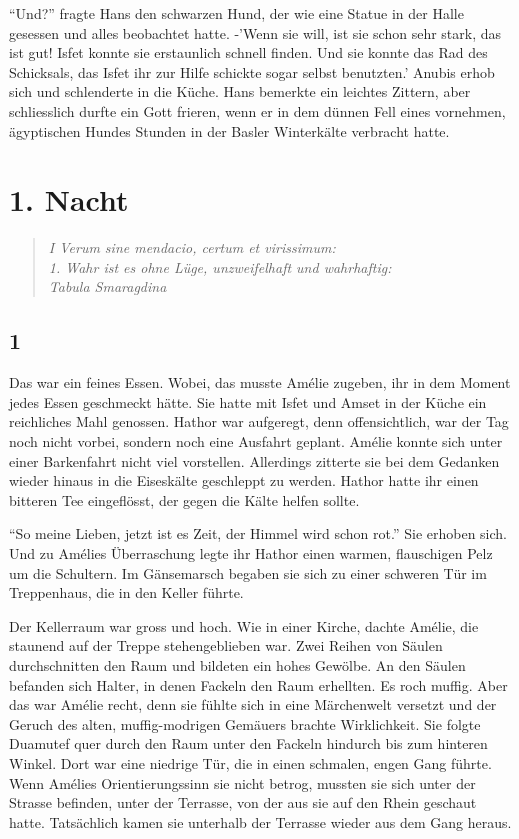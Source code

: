 \documentclass[11pt,titlepage,a5paper]{book}
\begin{document}
"`Und?"' fragte Hans den schwarzen Hund, der wie eine Statue in der Halle gesessen und alles beobachtet hatte. -'Wenn sie will, ist sie schon sehr stark, das ist gut! Isfet konnte sie erstaunlich schnell finden. Und sie konnte das Rad des Schicksals, das Isfet ihr zur Hilfe schickte sogar selbst benutzten.' Anubis erhob sich und schlenderte in die Küche. Hans bemerkte ein leichtes Zittern, aber schliesslich durfte ein Gott frieren, wenn er in dem dünnen Fell eines vornehmen, ägyptischen Hundes Stunden in der Basler Winterkälte verbracht hatte.

\chapter*{1. Nacht}

\begin{quotation}

\emph{I Verum sine mendacio, certum et virissimum:\\ 1. Wahr ist es ohne Lüge, unzweifelhaft und wahrhaftig:\\Tabula Smaragdina}

\end{quotation}

\section*{1}

Das war ein feines Essen. Wobei, das musste Amélie zugeben, ihr in dem Moment jedes Essen geschmeckt hätte. Sie hatte mit Isfet und Amset in der Küche ein reichliches Mahl genossen. Hathor war aufgeregt, denn offensichtlich, war der Tag noch nicht vorbei, sondern noch eine Ausfahrt geplant. Amélie konnte sich unter einer Barkenfahrt nicht viel vorstellen. Allerdings zitterte sie bei dem Gedanken wieder hinaus in die Eiseskälte geschleppt zu werden. Hathor hatte ihr einen bitteren Tee eingeflösst, der gegen die Kälte helfen sollte.

"`So meine Lieben, jetzt ist es Zeit, der Himmel wird schon rot."' Sie erhoben sich. Und zu Amélies Überraschung legte ihr Hathor einen warmen, flauschigen Pelz um die Schultern. Im Gänsemarsch begaben sie sich zu einer schweren Tür im Treppenhaus, die in den Keller führte. 

Der Kellerraum war gross und hoch. Wie in einer Kirche, dachte Amélie, die staunend auf der Treppe stehengeblieben war. Zwei Reihen von Säulen durchschnitten den Raum und bildeten ein hohes Gewölbe. An den Säulen befanden sich Halter, in denen Fackeln den Raum erhellten. Es roch muffig. Aber das war Amélie recht, denn sie fühlte sich in eine Märchenwelt versetzt und der Geruch des alten, muffig-modrigen Gemäuers brachte Wirklichkeit. Sie folgte Duamutef quer durch den Raum unter den Fackeln hindurch bis zum hinteren Winkel. Dort war eine niedrige Tür, die in einen schmalen, engen Gang führte. Wenn Amélies Orientierungssinn sie nicht betrog, mussten sie sich unter der Strasse befinden, unter der Terrasse, von der aus sie auf den Rhein geschaut hatte. Tatsächlich kamen sie unterhalb der Terrasse wieder aus dem Gang heraus. 
\end{document}
